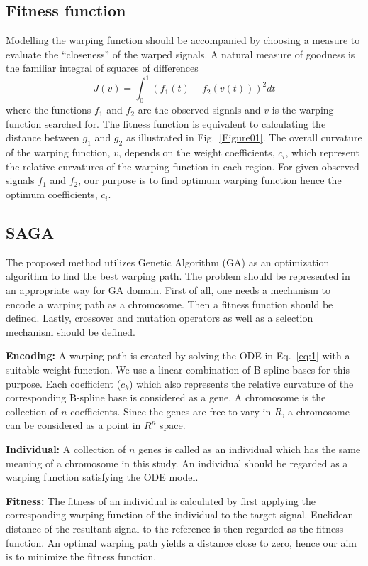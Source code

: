 \documentclass[number,1p,12pt]{elsarticle}
\begin{document}
\subsection{Fitness function}
Modelling the warping function should be accompanied by choosing a measure to evaluate the ``closeness'' of the warped signals. A natural measure of goodness is the familiar integral of squares of differences
\begin{equation}
J(v) = \int_0^1 \left(f_1(t)-f_2(v(t))\right)^2 dt
 \label{eq:6}
\end{equation}
where the functions $f_1$ and $f_2$ are the observed signals and $v$ is the warping function searched for. The fitness function is equivalent to calculating the distance between $g_1$ and $g_2$ as illustrated in Fig.~\ref{Figure01}. The overall curvature of the warping function, $v$, depends on the weight coefficients, $c_i$, which represent the relative curvatures of the warping function in each region. For given observed signals $f_1$ and $f_2$, our purpose is to find optimum warping function hence the optimum coefficients, $c_i$. 

\subsection{SAGA}
The proposed method utilizes Genetic Algorithm (GA) as an optimization algorithm to find the best warping path. The problem should be represented in an appropriate way for GA domain. First of all, one needs a mechanism to encode a warping path as a chromosome. Then a fitness function should be defined. Lastly, crossover and mutation operators as well as a selection mechanism should be defined. 

{\bf Encoding:} A warping path is created by solving the ODE in Eq.~\ref{eq:1} with a suitable  weight function. We use a linear combination of B-spline bases for this purpose. Each coefficient ($c_k$) which also represents the relative curvature of the corresponding B-spline base is considered as a gene. A chromosome is the collection of $n$ coefficients. Since the genes are free to vary in $R$, a chromosome can be considered as a point in $R^n$ space. 

{\bf Individual:} A collection of $n$ genes is called as an individual which has the same meaning of a chromosome in this study. An individual should be regarded as a warping function satisfying the ODE model. 

{\bf Fitness:} The fitness of an individual is calculated by first applying the corresponding warping function of the individual to the target signal. Euclidean distance of the resultant signal to the reference is then regarded as the fitness function. An optimal warping path yields a distance close to zero, hence our aim is to minimize the fitness function. 
\end{document}

